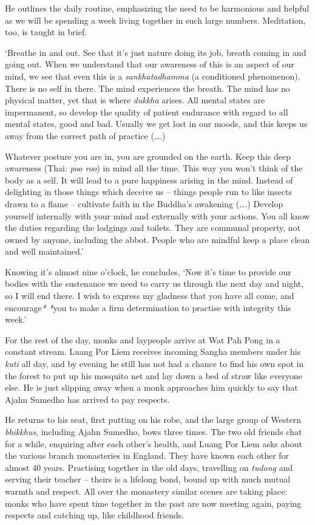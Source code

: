 He outlines the daily routine, emphasizing the need to be harmonious and
helpful as we will be spending a week living together in such large
numbers. Meditation, too, is taught in brief. 

`Breathe in and out. See that it's just nature doing its job, breath
coming in and going out. When we understand that our awareness of this
is an aspect of our mind, we see that even this is a
\emph{sankhatadhamma} (a conditioned phenomenon). There is no self in
there. The mind experiences the breath. The mind has no physical matter, 
yet that is where \emph{dukkha} arises. All mental states are
impermanent, so develop the quality of patient endurance with regard to
all mental states, good and bad. Usually we get lost in our moods, and
this keeps us away from the correct path of practice (\ldots{}.) 

Whatever posture you are in, you are grounded on the earth. Keep this
deep awareness (Thai: \emph{poo roo}) in mind all the time. This way you
won't think of the body as a self. It will lead to a pure happiness
arising in the mind. Instead of delighting in those things which deceive
us -- things people run to like insects drawn to a flame -- cultivate
faith in the Buddha's awakening (\ldots{}.) Develop yourself internally
with your mind and externally with your actions. You all know the duties
regarding the lodgings and toilets. They are communal property, not
owned by anyone, including the abbot. People who are mindful keep a
place clean and well maintained.'

Knowing it's almost nine o'clock, he concludes, `Now it's time to
provide our bodies with the sustenance we need to carry us through the
next day and night, so I will end there. I wish to express my gladness
that you have all come, and encourage\emph{*} \emph{*}you to make a firm
determination to practise with integrity this week.'

For the rest of the day, monks and laypeople arrive at Wat Pah Pong in a
constant stream. Luang Por Liem receives incoming Sangha members under
his \emph{kuti} all day, and by evening he still has not had a chance to
find his own spot in the forest to put up his mosquito net and lay down
a bed of straw like everyone else. He is just slipping away when a monk
approaches him quickly to say that Ajahn Sumedho has arrived to pay
respects. 

He returns to his seat, first putting on his robe, and the large group
of Western \emph{bhikkhus}, including Ajahn Sumedho, bows three times. 
The two old friends chat for a while, enquiring after each other's
health, and Luang Por Liem asks about the various branch monasteries in
England. They have known each other for almost 40 years. Practising
together in the old days, travelling on \emph{tudong} and serving their
teacher -- theirs is a lifelong bond, bound up with much mutual warmth
and respect. All over the monastery similar scenes are taking place: 
monks who have spent time together in the past are now meeting again, 
paying respects and catching up, like childhood friends. 

